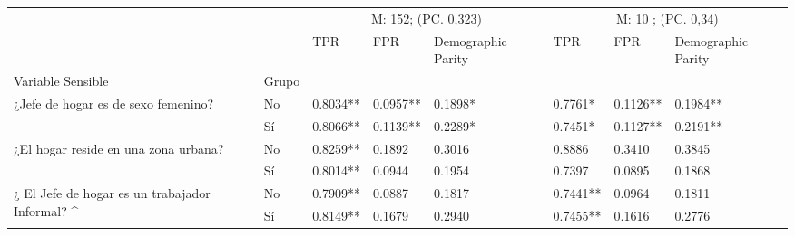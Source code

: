 \begin{tabular}{llllllll}
\toprule
 &  & \multicolumn{3}{c}{M: 152; (PC. 0,323)} & \multicolumn{3}{c}{M: 10 ; (PC. 0,34)} \\
\cmidrule(lr){3-5} \cmidrule(lr){6-8}
 &  & TPR & FPR & Demographic Parity & TPR & FPR & Demographic Parity \\
Variable Sensible & Grupo &  &  &  &  &  &  \\
\midrule
\multirow[t]{2}{*}{¿Jefe de hogar es 
de sexo femenino?} & No & 0.8034** & 0.0957** & 0.1898* & 0.7761* & 0.1126** & 0.1984** \\
 & Sí & 0.8066** & 0.1139** & 0.2289* & 0.7451* & 0.1127** & 0.2191** \\
\multirow[t]{2}{*}{¿El hogar reside en 
una zona urbana?} & No & 0.8259** & 0.1892 & 0.3016 & 0.8886 & 0.3410 & 0.3845 \\
 & Sí & 0.8014** & 0.0944 & 0.1954 & 0.7397 & 0.0895 & 0.1868 \\
\multirow[t]{2}{*}{¿ El Jefe de hogar 
es un trabajador Informal? ^} & No & 0.7909** & 0.0887 & 0.1817 & 0.7441** & 0.0964 & 0.1811 \\
 & Sí & 0.8149** & 0.1679 & 0.2940 & 0.7455** & 0.1616 & 0.2776 \\
\bottomrule
\end{tabular}
